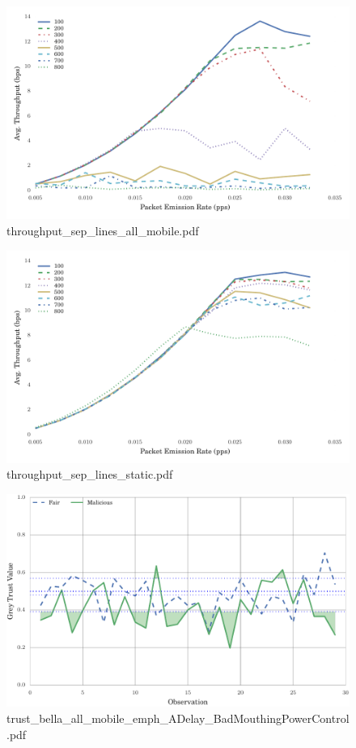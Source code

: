\documentclass{article}
\begin{document}
\begin{figure}[h!]
\centering
\includegraphics[width=\linewidth]{throughput_sep_lines_all_mobile.pdf}
\caption{throughput\_sep\_lines\_all\_mobile.pdf}
\end{figure}




\begin{figure}[h!]
\centering
\includegraphics[width=\linewidth]{throughput_sep_lines_static.pdf}
\caption{throughput\_sep\_lines\_static.pdf}
\end{figure}




\begin{figure}[h!]
\centering
\includegraphics[width=\linewidth]{trust_bella_all_mobile_emph_ADelay_BadMouthingPowerControl.pdf}
\caption{trust\_bella\_all\_mobile\_emph\_ADelay\_BadMouthingPowerControl.pdf}
\end{figure}
\end{document}
